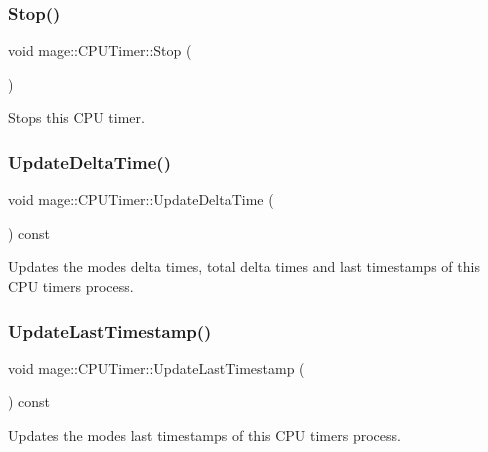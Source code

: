 \subsubsection{\texorpdfstring{Stop()}{Stop()}}
{\footnotesize\ttfamily void mage\+::\+C\+P\+U\+Timer\+::\+Stop (\begin{DoxyParamCaption}{ }\end{DoxyParamCaption})}

Stops this C\+PU timer. \hypertarget{classmage_1_1_c_p_u_timer_afd5e90ee6e0ad80257bbf6babc440f3b}{}\label{classmage_1_1_c_p_u_timer_afd5e90ee6e0ad80257bbf6babc440f3b} 
\subsubsection{\texorpdfstring{Update\+Delta\+Time()}{UpdateDeltaTime()}}
{\footnotesize\ttfamily void mage\+::\+C\+P\+U\+Timer\+::\+Update\+Delta\+Time (\begin{DoxyParamCaption}{ }\end{DoxyParamCaption}) const\hspace{0.3cm}{\ttfamily [private]}}

Updates the modes\textquotesingle{} delta times, total delta times and last timestamps of this C\+PU timer\textquotesingle{}s process. \hypertarget{classmage_1_1_c_p_u_timer_a1e81db9e1df52fbdf89b042b3611cd80}{}\label{classmage_1_1_c_p_u_timer_a1e81db9e1df52fbdf89b042b3611cd80} 
\subsubsection{\texorpdfstring{Update\+Last\+Timestamp()}{UpdateLastTimestamp()}}
{\footnotesize\ttfamily void mage\+::\+C\+P\+U\+Timer\+::\+Update\+Last\+Timestamp (\begin{DoxyParamCaption}{ }\end{DoxyParamCaption}) const\hspace{0.3cm}{\ttfamily [private]}}

Updates the modes\textquotesingle{} last timestamps of this C\+PU timer\textquotesingle{}s process. 

